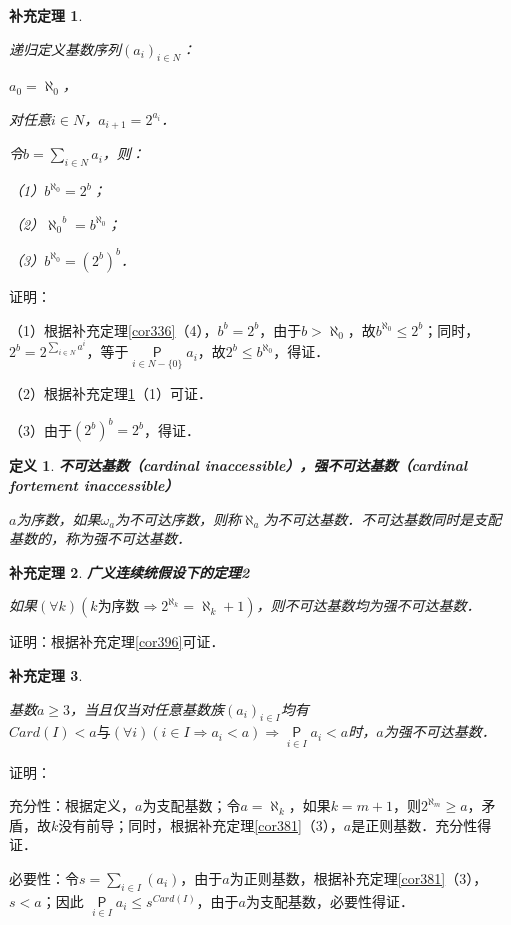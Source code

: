 \documentclass[12pt, a4paper, oneside]{book}
\newtheorem{cor}{补充定理}
\newtheorem{de}{定义}
\begin{document}
			\begin{cor}\label{cor398}
				\hfill\par
				递归定义基数序列$(a_i)_{i\in N}$：
				\par
				$a_0=\aleph_0$，
				\par
				对任意$i\in N$，$a_{i+1}=2^{a_i}$．
				\par
				令$b=\sum\limits_{i\in N}a_i$，则：
				\par
				（1）$b^{\aleph_0}=2^b$；
				\par
				（2）${\aleph_0}^b=b^{\aleph_0}$；
				\par
				（3）$b^{\aleph_0}=(2^b)^b$．
			\end{cor}
			证明：
			\par
			（1）根据补充定理\ref{cor336}（4），$b^b=2^b$，由于$b>\aleph_0$，故$b^{\aleph_0}\leq 2^b$；同时，$2^b=2^{\sum\limits_{i\in N}a^i}$，等于$\mathop{\mathsf{P}}\limits_{i\in N-\{0\}}a_i$，故$2^b\leq b^{\aleph_0}$，得证．
			\par
			（2）根据补充定理\ref{cor398}（1）可证．
			\par
			（3）由于$(2^b)^b=2^b$，得证．
			
			\begin{de}
				\textbf{不可达基数（cardinal inaccessible），强不可达基数（cardinal fortement inaccessible）}
				\par
				$a$为序数，如果$\omega_a$为不可达序数，则称$\aleph_a$为不可达基数．不可达基数同时是支配基数的，称为强不可达基数．
			\end{de}
			
			\begin{cor}\label{cor399}
				\textbf{广义连续统假设下的定理2}
				\par
				如果$(\forall k)(k\text{为序数}\Rightarrow 2^{\aleph_k}=\aleph_k+1)$，则不可达基数均为强不可达基数．
			\end{cor}
			证明：根据补充定理\ref{cor396}可证．
			
			\begin{cor}\label{cor400}
				\hfill\par
				基数$a\geq 3$，当且仅当对任意基数族$(a_i)_{i\in I}$均有$Card(I)<a\text{与}(\forall i)(i\in I\Rightarrow a_i<a)\Rightarrow \mathop{\mathsf{P}}\limits_{i\in I}a_i<a$时，$a$为强不可达基数．
			\end{cor}
			证明：
			\par
			充分性：根据定义，$a$为支配基数；令$a=\aleph_k$，如果$k=m+1$，则$2^{\aleph_m}\geq a$，矛盾，故$k$没有前导；同时，根据补充定理\ref{cor381}（3），$a$是正则基数．充分性得证．
			\par
			必要性：令$s=\sum\limits_{i\in I}(a_i)$，由于$a$为正则基数，根据补充定理\ref{cor381}（3），$s<a$；因此 $\mathop{\mathsf{P}}\limits_{i\in I}a_i\leq s^{Card(I)}$，由于$a$为支配基数，必要性得证．
			
\end{document}
